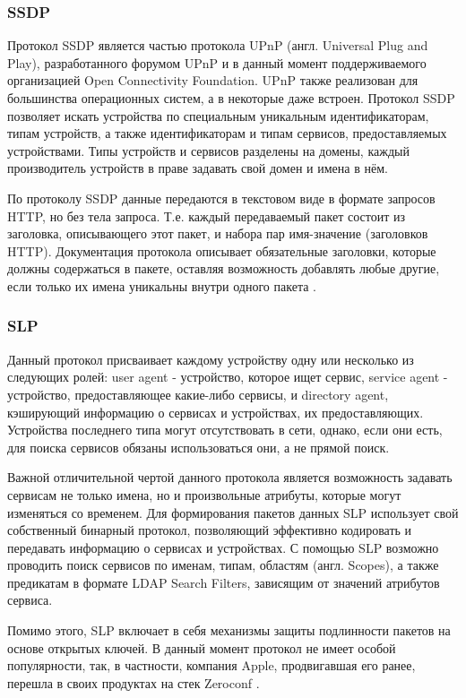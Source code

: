 \subsubsection{SSDP}
Протокол SSDP является частью протокола UPnP (англ. Universal Plug and Play), разработанного форумом UPnP и в данный момент поддерживаемого организацией Open Connectivity Foundation.
UPnP также реализован для большинства операционных систем, а в некоторые даже встроен.
Протокол SSDP позволяет искать устройства по специальным уникальным идентификаторам, типам устройств, а также идентификаторам и типам сервисов, предоставляемых устройствами.
Типы устройств и сервисов разделены на домены, каждый производитель устройств в праве задавать свой домен и имена в нём.

По протоколу SSDP данные передаются в текстовом виде в формате запросов HTTP, но без тела запроса.
Т.е. каждый передаваемый пакет состоит из заголовка, описывающего этот пакет, и набора пар имя-значение (заголовков HTTP).
Документация протокола описывает обязательные заголовки, которые должны содержаться в пакете, оставляя возможность добавлять любые другие, если только их имена уникальны внутри одного пакета \cite{web:upnp}.

\subsubsection{SLP}
Данный протокол присваивает каждому устройству одну или несколько из следующих ролей: user agent - устройство, которое ищет сервис, service agent - устройство, предоставляющее какие-либо сервисы, и directory agent, кэширующий информацию о сервисах и устройствах, их предоставляющих.
Устройства последнего типа могут отсутствовать в сети, однако, если они есть, для поиска сервисов обязаны использоваться они, а не прямой поиск.

Важной отличительной чертой данного протокола является возможность задавать сервисам не только имена, но и произвольные атрибуты, которые могут изменяться со временем.
Для формирования пакетов данных SLP использует свой собственный бинарный протокол, позволяющий эффективно кодировать и передавать информацию о сервисах и устройствах.
С помощью SLP возможно проводить поиск сервисов по именам, типам, областям (англ. Scopes), а также предикатам в формате LDAP Search Filters, зависящим от значений атрибутов сервиса.

Помимо этого, SLP включает в себя механизмы защиты подлинности пакетов на основе открытых ключей. 
В данный момент протокол не имеет особой популярности, так, в частности, компания Apple, продвигавшая его ранее, перешла в своих продуктах на стек Zeroconf \cite{web:slp}.

